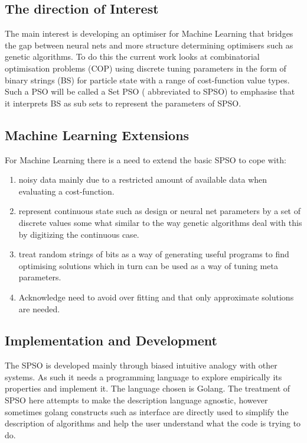\documentclass[a4paper,oneside,english]{book}
\numberwithin{equation}{section}
\numberwithin{figure}{section}
\begin{document}
\subsection{The direction of Interest}
The main interest is developing an optimiser for Machine Learning that bridges the gap between neural nets and more structure determining optimisers such as genetic algorithms. To do this the current work looks at combinatorial optimisation problems (COP) using discrete tuning parameters in the form of binary strings (BS) for particle state with a range of cost-function value types. Such  a PSO will be called a Set PSO ( abbreviated to SPSO) to emphasise that it interprets BS as  sub sets to represent the parameters of SPSO. 

\subsection{Machine Learning Extensions }
For  Machine Learning there is a need to extend the basic SPSO to cope with:
\begin{enumerate}
	\item noisy data mainly due to a restricted amount of available data when evaluating a cost-function. 
	\item represent continuous state such as design or neural net parameters by a set of discrete values some what similar to the way genetic algorithms deal with this by digitizing the continuous case.
	\item treat random strings of bits as a way of generating useful programs  to find optimising solutions which in turn can be used as a way of tuning meta parameters.
	\item Acknowledge need to avoid over fitting and that only approximate solutions are needed. 
\end{enumerate}  
\subsection{Implementation and Development}
The SPSO is developed mainly through biased intuitive analogy with  other systems. As such it needs a programming language to explore empirically its properties and implement it. The language chosen is Golang. The treatment of SPSO here attempts to make the description language agnostic, however sometimes golang constructs such as interface are directly used to simplify the description of algorithms and help the user understand what the code is trying to do.     
\end{document}
